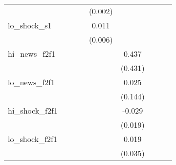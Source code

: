 {\begin{tabular}{l*{8}{c}}
            &                     &                     &                     &     (0.002)         &                     &                     &                     &                     \\
\addlinespace
lo\_shock\_s1 &                     &                     &                     &       0.011         &                     &                     &                     &                     \\
            &                     &                     &                     &     (0.006)         &                     &                     &                     &                     \\
\addlinespace
hi\_news\_f2f1&                     &                     &                     &                     &       0.437         &                     &                     &                     \\
            &                     &                     &                     &                     &     (0.431)         &                     &                     &                     \\
\addlinespace
lo\_news\_f2f1&                     &                     &                     &                     &       0.025         &                     &                     &                     \\
            &                     &                     &                     &                     &     (0.144)         &                     &                     &                     \\
\addlinespace
hi\_shock\_f2f1&                     &                     &                     &                     &      -0.029         &                     &                     &                     \\
            &                     &                     &                     &                     &     (0.019)         &                     &                     &                     \\
\addlinespace
lo\_shock\_f2f1&                     &                     &                     &                     &       0.019         &                     &                     &                     \\
            &                     &                     &                     &                     &     (0.035)         &                     &                     &                     \\

\end{tabular}}
